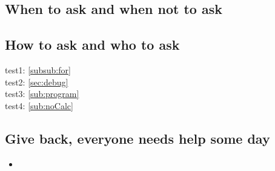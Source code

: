 \subsection{When to ask and when not to ask}
\label{sub:whenAsk}

\subsection{How to ask and who to ask}
\label{sub:whoAsk}

test1: \ref{subsub:for}\\
test2: \ref{sec:debug}\\
test3: \ref{sub:program}\\
test4: \ref{sub:noCalc}\\

\subsection{Give back, everyone needs help some day}
\label{sub:gibHelp}
\begin{itemize}
    \item
\end{itemize}
